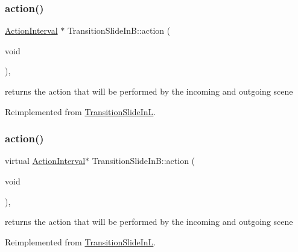 \subsubsection{\texorpdfstring{action()}{action()}\hspace{0.1cm}{\footnotesize\ttfamily [1/2]}}
{\footnotesize\ttfamily \hyperlink{classActionInterval}{Action\+Interval} $\ast$ Transition\+Slide\+In\+B\+::action (\begin{DoxyParamCaption}\item[{void}]{ }\end{DoxyParamCaption})\hspace{0.3cm}{\ttfamily [override]}, {\ttfamily [virtual]}}

returns the action that will be performed by the incoming and outgoing scene 

Reimplemented from \hyperlink{classTransitionSlideInL_a22b0c0b07f15fc0d19fcdf01e4182a3e}{Transition\+Slide\+InL}.

\mbox{\label{classTransitionSlideInB_a512b4ad5aae8a5b408438a535a4b146e}} 
\subsubsection{\texorpdfstring{action()}{action()}\hspace{0.1cm}{\footnotesize\ttfamily [2/2]}}
{\footnotesize\ttfamily virtual \hyperlink{classActionInterval}{Action\+Interval}$\ast$ Transition\+Slide\+In\+B\+::action (\begin{DoxyParamCaption}\item[{void}]{ }\end{DoxyParamCaption})\hspace{0.3cm}{\ttfamily [override]}, {\ttfamily [virtual]}}

returns the action that will be performed by the incoming and outgoing scene 

Reimplemented from \hyperlink{classTransitionSlideInL_a22b0c0b07f15fc0d19fcdf01e4182a3e}{Transition\+Slide\+InL}.

\mbox{\label{classTransitionSlideInB_ae5ffc089db1f0879b9c7c8ab0fa31149}} 

